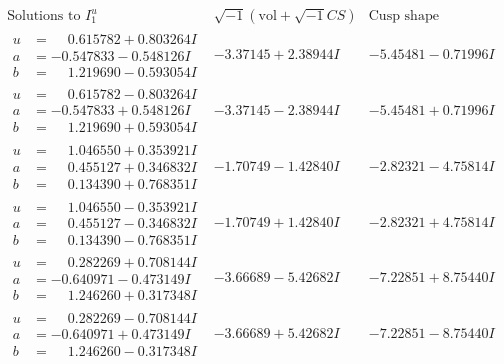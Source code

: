 \documentclass[1p]{elsarticle_modified}
\theoremstyle{definition}
\newcommand{\I}{\sqrt{-1}}
\begin{document}
$$\begin{array}{c|c|c}  
\text{Solutions to }I^u_{1}& \I (\text{vol} + \sqrt{-1}CS) & \text{Cusp shape}\\
 \hline 
\begin{aligned}
u &= \phantom{-}0.615782 + 0.803264 I \\
a &= -0.547833 - 0.548126 I \\
b &= \phantom{-}1.219690 - 0.593054 I\end{aligned}
 & -3.37145 + 2.38944 I & -5.45481 - 0.71996 I \\ \hline\begin{aligned}
u &= \phantom{-}0.615782 - 0.803264 I \\
a &= -0.547833 + 0.548126 I \\
b &= \phantom{-}1.219690 + 0.593054 I\end{aligned}
 & -3.37145 - 2.38944 I & -5.45481 + 0.71996 I \\ \hline\begin{aligned}
u &= \phantom{-}1.046550 + 0.353921 I \\
a &= \phantom{-}0.455127 + 0.346832 I \\
b &= \phantom{-}0.134390 + 0.768351 I\end{aligned}
 & -1.70749 - 1.42840 I & -2.82321 - 4.75814 I \\ \hline\begin{aligned}
u &= \phantom{-}1.046550 - 0.353921 I \\
a &= \phantom{-}0.455127 - 0.346832 I \\
b &= \phantom{-}0.134390 - 0.768351 I\end{aligned}
 & -1.70749 + 1.42840 I & -2.82321 + 4.75814 I \\ \hline\begin{aligned}
u &= \phantom{-}0.282269 + 0.708144 I \\
a &= -0.640971 - 0.473149 I \\
b &= \phantom{-}1.246260 + 0.317348 I\end{aligned}
 & -3.66689 - 5.42682 I & -7.22851 + 8.75440 I \\ \hline\begin{aligned}
u &= \phantom{-}0.282269 - 0.708144 I \\
a &= -0.640971 + 0.473149 I \\
b &= \phantom{-}1.246260 - 0.317348 I\end{aligned}
 & -3.66689 + 5.42682 I & -7.22851 - 8.75440 I \\ \hline\begin{aligned}

\end{aligned}
\end{array}$$
\end{document}
